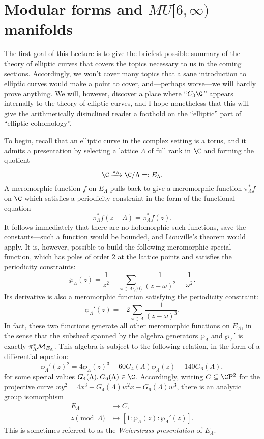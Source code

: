









\section{Modular forms and \texorpdfstring{$MU[6, \infty)$}{MU[6, oo)}--manifolds}\label{SectionEllipticCurvesAndThetaFunctions}

The first goal of this Lecture is to give the briefest possible summary of the theory of elliptic curves that covers the topics necessary to us in the coming sections.  Accordingly, we won't cover many topics that a sane introduction to elliptic curves would make a point to cover, and---perhaps worse---we will hardly prove anything.  We will, however, discover a place where ``$C_3 \G$'' appears internally to the theory of elliptic curves, and I hope nonetheless that this will give the arithmetically disinclined reader a foothold on the ``elliptic'' part of ``elliptic cohomology''.

To begin, recall that an elliptic curve in the complex setting is a torus, and it admits a presentation by selecting a lattice $\Lambda$ of full rank in $\C$ and forming the quotient \[\C \xrightarrow{\pi_\Lambda} \C / \Lambda =: E_\Lambda.\]  A meromorphic function $f$ on $E_\Lambda$ pulls back to give a meromorphic function $\pi_\Lambda^* f$ on $\C$ which satisfies a periodicity constraint in the form of the functional equation \[\pi_\Lambda^* f(z + \Lambda) = \pi_\Lambda^* f(z).\]  It follows immediately that there are no holomorphic such functions, save the constants---such a function would be bounded, and Liouville's theorem would apply.  It is, however, possible to build the following meromorphic special function, which has poles of order $2$ at the lattice points and satisfies the periodicity constraints: \[\wp_\Lambda(z) = \frac{1}{z^2} + \sum_{\omega \in \Lambda \setminus \{0\}} \frac{1}{(z - \omega)^2} - \frac{1}{\omega^2}.\]  Its derivative is also a meromorphic function satisfying the periodicity constraint: \[\wp_\Lambda'(z) = -2 \sum_{\omega \in \Lambda} \frac{1}{(z - \omega)^3}.\]  In fact, these two functions generate all other meromorphic functions on $E_\Lambda$, in the sense that the subsheaf spanned by the algebra generators $\wp_\Lambda$ and $\wp_\Lambda'$ is exactly $\pi_\Lambda^* \mathcal{M}_{E_\Lambda}$.  This algebra is subject to the following relation, in the form of a differential equation: \[\wp_\Lambda'(z)^2 = 4 \wp_\Lambda(z)^3 - 60G_4(\Lambda) \wp_\Lambda(z) - 140G_6(\Lambda),\] for some special values $G_4(\Lambda), G_6(\Lambda) \in \C$.  Accordingly, writing $C \subseteq \CP^2$ for the projective curve $wy^2 = 4x^3 - G_4(\Lambda) w^2 x - G_6(\Lambda) w^3$, there is an analytic group isomorphism
\begin{align*}
E_\Lambda & \to C, \\
z \pmod \Lambda & \mapsto [1: \wp_\Lambda(z): \wp_\Lambda'(z)].
\end{align*}
This is sometimes referred to as the \textit{Weierstrass presentation} of $E_\Lambda$.

